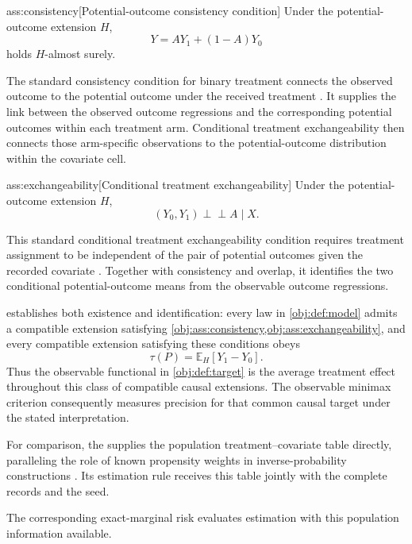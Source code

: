 \begin{assumptionv}{ass:consistency}[Potential-outcome consistency condition]
Under the potential-outcome extension \(H\),
\[
Y=AY_1+(1-A)Y_0
\]
holds \(H\)-almost surely.
\end{assumptionv}

The standard consistency condition for binary treatment connects the observed outcome to the potential outcome under the received treatment \citep{SplawaNeyman1990,Rubin1974}. It supplies the link between the observed outcome regressions and the corresponding potential outcomes within each treatment arm. Conditional treatment exchangeability then connects those arm-specific observations to the potential-outcome distribution within the covariate cell.

\begin{assumptionv}{ass:exchangeability}[Conditional treatment exchangeability]
Under the potential-outcome extension \(H\),
\[
(Y_0,Y_1)\perp\!\!\!\perp A\mid X.
\]
\end{assumptionv}

This standard conditional treatment exchangeability condition requires treatment assignment to be independent of the pair of potential outcomes given the recorded covariate \citep{Rosenbaum1983,Imbens2015}. Together with consistency and overlap, it identifies the two conditional potential-outcome means from the observable outcome regressions.

 establishes both existence and identification: every law in \cref{obj:def:model} admits a compatible extension satisfying \cref{obj:ass:consistency,obj:ass:exchangeability}, and every compatible extension satisfying these conditions obeys
\[
\tau(P)=\mathbb E_H[Y_1-Y_0].
\]
Thus the observable functional in \cref{obj:def:target} is the average treatment effect throughout this class of compatible causal extensions. The observable minimax criterion consequently measures precision for that common causal target under the stated interpretation.

For comparison, the  supplies the population treatment--covariate table directly, paralleling the role of known propensity weights in inverse-probability constructions \citep{Horvitz1952,Hirano2003}. Its estimation rule  receives this table jointly with the complete records and the seed.



The corresponding exact-marginal risk  evaluates estimation with this population information available.

